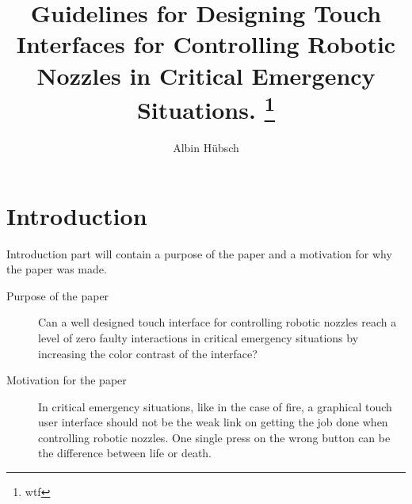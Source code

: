 \documentclass[runningheads,a4paper,oribibl]{llncs}
\begin{document}
\pagestyle{headings}

\mainmatter

\title{Guidelines for Designing Touch Interfaces for Controlling Robotic Nozzles in Critical Emergency Situations. \thanks{wtf}}


\author{Albin Hübsch}


\maketitle

%
%

\section{Introduction}
Introduction part will contain a purpose of the paper and a motivation for why the paper was made.

\begin{description}
	\item[Purpose of the paper] Can a well designed touch interface for controlling robotic nozzles reach a level of zero faulty interactions in critical emergency situations by increasing the color contrast of the interface?
	\item[Motivation for the paper] In critical emergency situations, like in the case of fire, a graphical touch user interface should not be the weak link on getting the job done when controlling robotic nozzles. One single press on the wrong button can be the difference between life or death.
\end{description}
\end{document}
